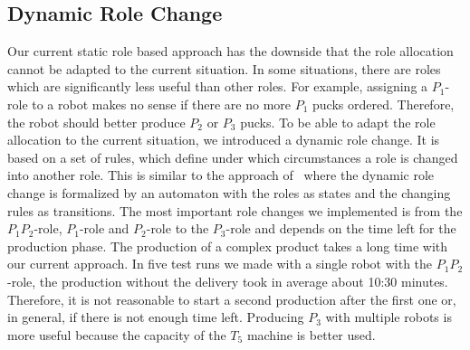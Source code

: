 \subsection{Dynamic Role Change}
Our current static role based approach has the downside that the role allocation cannot be adapted to the current situation. In some situations, there are roles which are significantly less useful than other roles. For example, assigning a $P_1$-role to a robot makes no sense if there are no more $P_1$ pucks ordered. Therefore, the robot should better produce $P_2$ or $P_3$ pucks. To be able to adapt the role allocation to the current situation, we introduced a dynamic role change. It is based on a set of rules, which define under which circumstances a role is changed into another role. This is similar to the approach of~\cite{dynamic_role_assignment} where the dynamic role change is formalized by an automaton with the roles as states and the changing rules as transitions. The most important role changes we implemented is from the $P_1P_2$-role, $P_1$-role and $P_2$-role to the $P_3$-role and depends on the time left for the production phase. The production of a complex product takes a long time with our current approach. In five test runs we made with a single robot with the $P_1P_2$-role, the production without the delivery took in average about 10:30 minutes. Therefore, it is not reasonable to start a second production after the first one or, in general, if there is not enough time left. Producing $P_3$ with multiple robots is more useful because the capacity of the $T_5$ machine is better used.
